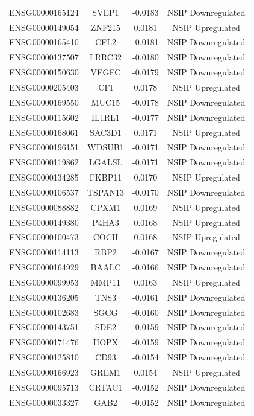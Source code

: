 \documentclass[
]{article}
\begin{document}
\begin{singlespace}
\begin{longtable}[t]{lccc}
ENSG00000165124 & SVEP1 & -0.0183 & NSIP Downregulated\\
ENSG00000149054 & ZNF215 & 0.0181 & NSIP Upregulated\\
ENSG00000165410 & CFL2 & -0.0181 & NSIP Downregulated\\
ENSG00000137507 & LRRC32 & -0.0180 & NSIP Downregulated\\
\addlinespace
ENSG00000150630 & VEGFC & -0.0179 & NSIP Downregulated\\
ENSG00000205403 & CFI & 0.0178 & NSIP Upregulated\\
ENSG00000169550 & MUC15 & -0.0178 & NSIP Downregulated\\
ENSG00000115602 & IL1RL1 & -0.0177 & NSIP Downregulated\\
ENSG00000168061 & SAC3D1 & 0.0171 & NSIP Upregulated\\
\addlinespace
ENSG00000196151 & WDSUB1 & -0.0171 & NSIP Downregulated\\
ENSG00000119862 & LGALSL & -0.0171 & NSIP Downregulated\\
ENSG00000134285 & FKBP11 & 0.0170 & NSIP Upregulated\\
ENSG00000106537 & TSPAN13 & -0.0170 & NSIP Downregulated\\
ENSG00000088882 & CPXM1 & 0.0169 & NSIP Upregulated\\
\addlinespace
ENSG00000149380 & P4HA3 & 0.0168 & NSIP Upregulated\\
ENSG00000100473 & COCH & 0.0168 & NSIP Upregulated\\
ENSG00000114113 & RBP2 & -0.0167 & NSIP Downregulated\\
ENSG00000164929 & BAALC & -0.0166 & NSIP Downregulated\\
ENSG00000099953 & MMP11 & 0.0163 & NSIP Upregulated\\
\addlinespace
ENSG00000136205 & TNS3 & -0.0161 & NSIP Downregulated\\
ENSG00000102683 & SGCG & -0.0160 & NSIP Downregulated\\
ENSG00000143751 & SDE2 & -0.0159 & NSIP Downregulated\\
ENSG00000171476 & HOPX & -0.0159 & NSIP Downregulated\\
ENSG00000125810 & CD93 & -0.0154 & NSIP Downregulated\\
\addlinespace
ENSG00000166923 & GREM1 & 0.0154 & NSIP Upregulated\\
ENSG00000095713 & CRTAC1 & -0.0152 & NSIP Downregulated\\
ENSG00000033327 & GAB2 & -0.0152 & NSIP Downregulated\\

\end{longtable}
\end{singlespace}
\end{document}
